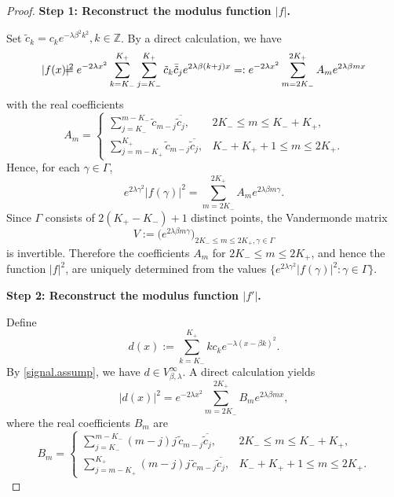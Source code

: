 \documentclass[11pt,oneside,reqno]{amsart}
\numberwithin{equation}{section}
\def\Z{ {\mathbb Z} }
\begin{document}
\begin{proof}
\noindent\textbf{Step 1:  Reconstruct the modulus function $|f|$.}
\smallskip

 Set
 $\tilde c_k=c_ke^{-\lambda\beta^2k^2}, k\in\Z$. %
 By a direct calculation, we have %
 \begin{eqnarray}\label{f.abs.eq.1}
 |f(x)|^2 \hskip-0.05in&\hskip-0.1in=&\hskip-0.1in e^{-2\lambda x^2}\sum_{k=K_-}^{K_+}\sum_{j=K_-}^{K_+}{\tilde c}_k\bar{\tilde c}_je^{2\lambda\beta(k+j)x}
 =:e^{-2\lambda x^2}\sum_{m=2K_-}^{2K_+}A_me^{2\lambda\beta mx}
 \end{eqnarray}
 with the real coefficients
\begin{equation}\label{A.def.1}
A_m=\left\{
\begin{array}{ll}
\displaystyle \sum_{j=K_-}^{m-K_-}\tilde c_{m-j}\overline{\tilde c_j},
& 2K_-\le m\le K_-+K_+,\\[2mm]
\displaystyle \sum_{j=m-K_+}^{K_+}\tilde c_{m-j}\overline{\tilde c_j},
& K_-+K_+ +1\le m\le 2K_+.
\end{array}
\right.
\end{equation}
Hence, for each $\gamma\in\Gamma$,
\[
e^{2\lambda \gamma^2}|f(\gamma)|^2=\sum_{m=2K_-}^{2K_+}A_m e^{2\lambda\beta m\gamma}.
\]
Since $\Gamma$ consists of $2(K_+-K_-)+1$ distinct points, the Vandermonde matrix
\[
V:=\Big(e^{2\lambda\beta m\gamma}\Big)_{2K_-\le m\le 2K_+, \gamma\in\Gamma}
\]
is invertible. Therefore the coefficients $A_m$ for $2K_-\le m\le 2K_+$, and hence the function
$|f|^2$, are  uniquely determined from the values $\{e^{2\lambda\gamma^2}|f(\gamma)|^2:\gamma\in\Gamma\}$.

\smallskip
\medskip
\noindent\textbf{Step 2: Reconstruct the modulus function 
 $|f'|$.}
\smallskip

Define
\[
d(x):=\sum_{k=K_-}^{K_+} k c_k e^{-\lambda(x-\beta k)^2}.
\]
By \eqref{signal.assump}, we have $d\in V^\infty_{\beta,\lambda}$. A direct calculation yields
\begin{equation}\label{d.def}
|d(x)|^2=e^{-2\lambda x^2}\sum_{m=2K_-}^{2K_+}B_m e^{2\lambda\beta m x},
\end{equation}
where the real coefficients $B_m$ are
\begin{equation}\label{B.def.1}
B_m=\left\{
\begin{array}{ll}
\displaystyle \sum_{j=K_-}^{m-K_-}(m-j)j\,\tilde c_{m-j}\overline{\tilde c_j},
& 2K_-\le m\le K_-+K_+,\\[2mm]
\displaystyle \sum_{j=m-K_+}^{K_+}(m-j)j\,\tilde c_{m-j}\overline{\tilde c_j},
& K_-+K_+ +1\le m\le 2K_+.
\end{array}
\right.
\end{equation}


\end{proof}
\end{document}
